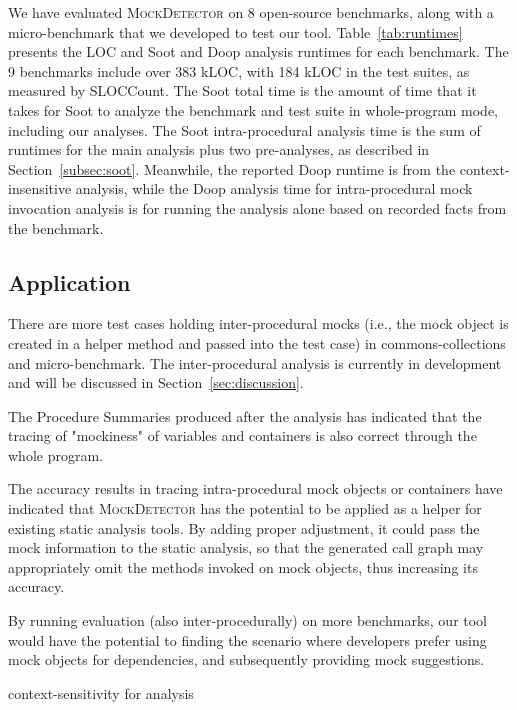 
We have evaluated \textsc{MockDetector} on 8 open-source benchmarks, along with a micro-benchmark that we developed to test our tool. Table~\ref{tab:runtimes} presents the LOC and Soot and Doop analysis runtimes for each benchmark. The 9 benchmarks include over 383 kLOC, with 184 kLOC in the test suites, as measured by SLOCCount. The Soot total time is the amount of time that it takes for Soot to analyze the benchmark and test suite in whole-program mode, including our analyses. The Soot intra-procedural analysis time is the sum of runtimes for the main analysis plus two pre-analyses, as described in Section~\ref{subsec:soot}. Meanwhile, the reported Doop runtime is from the context-insensitive analysis, while the Doop analysis time for intra-procedural mock invocation analysis is for running the analysis alone based on recorded facts from the benchmark.

\subsection{Application}
\label{subsec:static}

There are more test cases holding inter-procedural mocks (i.e., the mock object is created in a helper method and passed into the test case) in commons-collections and micro-benchmark. The inter-procedural analysis is currently in development and will be discussed in Section~\ref{sec:discussion}.

The Procedure Summaries produced after the analysis has indicated that the tracing of "mockiness" of variables and containers is also correct through the whole program. 

The accuracy results in tracing intra-procedural mock objects or containers have indicated that \textsc{MockDetector} has the potential to be applied as a helper for existing static analysis tools. By adding proper adjustment, it could pass the mock information to the static analysis, so that the generated call graph may appropriately omit the methods invoked on mock objects, thus increasing its accuracy.

By running evaluation (also inter-procedurally) on more benchmarks, our tool would have the potential to finding the scenario where developers prefer using mock objects for dependencies, and subsequently providing mock suggestions.


context-sensitivity for analysis
